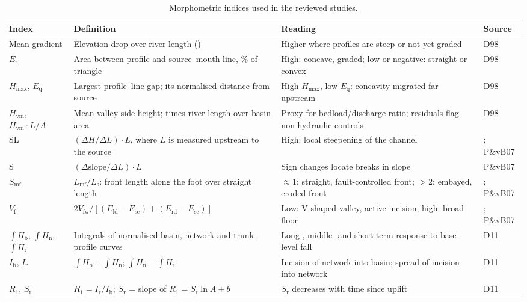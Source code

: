 \documentclass[10pt,a4paper,twocolumn]{article}
\newcommand{\permil}{\textperthousand}
\newcommand{\Hb}{\ensuremath{\int\!H_\mathrm{b}}}
\newcommand{\Hn}{\ensuremath{\int\!H_\mathrm{n}}}
\newcommand{\Hr}{\ensuremath{\int\!H_\mathrm{r}}}
\newcommand{\Hvm}{\ensuremath{H_\mathrm{vm}}}
\begin{document}
\begin{table}[t]
\centering
\caption{Morphometric indices used in the reviewed studies.}
\label{tab:indices}
\footnotesize
\begin{tabularx}{\textwidth}{@{}P{2.3cm}P{4.6cm}LP{2.0cm}@{}}
\toprule
\textbf{Index} & \textbf{Definition} & \textbf{Reading} & \textbf{Source}\\
\midrule
Mean gradient & Elevation drop over river length (\permil) & Higher where profiles are steep or not yet graded & D98\\
$E_\mathrm{r}$ & Area between profile and source--mouth line, \% of triangle & High: concave, graded; low or negative: straight or convex & D98\\
$H_\mathrm{max}$, $E_\mathrm{q}$ & Largest profile--line gap; its normalised distance from source & High $H_\mathrm{max}$, low $E_\mathrm{q}$: concavity migrated far upstream & D98\\
\Hvm, $\Hvm\!\cdot\!L/A$ & Mean valley-side height; times river length over basin area & Proxy for bedload/discharge ratio; residuals flag non-hydraulic controls & D98\\
SL & $(\Delta H/\Delta L)\cdot L$, where $L$ is measured upstream to the source & High: local steepening of the channel & \citet{Hack1973}; P\&vB07\\
S & $(\Delta\mathrm{slope}/\Delta L)\cdot L$ & Sign changes locate breaks in slope & P\&vB07\\
$S_\mathrm{mf}$ & $L_\mathrm{mf}/L_\mathrm{s}$: front length along the foot over straight length & $\approx$1: straight, fault-controlled front; $>$2: embayed, eroded front & \citet{BullMcFadden1977}; P\&vB07\\
$V_\mathrm{f}$ & $2V_\mathrm{fw}/[(E_\mathrm{ld}-E_\mathrm{sc})+(E_\mathrm{rd}-E_\mathrm{sc})]$ & Low: V-shaped valley, active incision; high: broad floor & \citet{BullMcFadden1977}; P\&vB07\\
\Hb, \Hn, \Hr & Integrals of normalised basin, network and trunk-profile curves & Long-, middle- and short-term response to base-level fall & D11\\
$I_\mathrm{b}$, $I_\mathrm{r}$ & $\Hb-\Hn$; $\Hn-\Hr$ & Incision of network into basin; spread of incision into network & D11\\
$R_1$, $S_\mathrm{r}$ & $R_1=I_\mathrm{r}/I_\mathrm{b}$; $S_\mathrm{r}$ = slope of $R_1=S_\mathrm{r}\ln A+b$ & $S_\mathrm{r}$ decreases with time since uplift & D11\\
\bottomrule
\end{tabularx}
\end{table}
\end{document}
